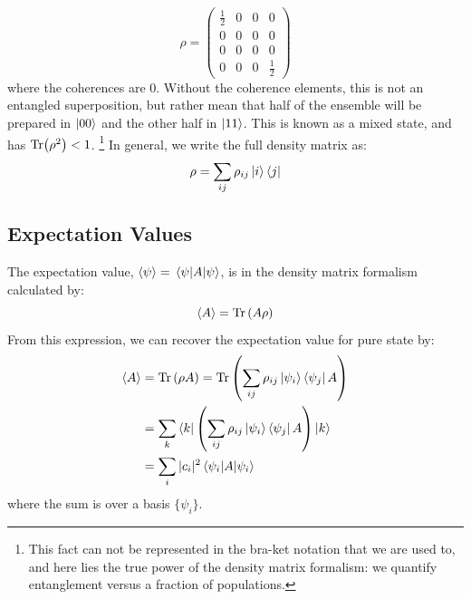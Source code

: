 \begin{equation}
    \rho = 
    \begin{pmatrix}
        \frac{1}{2} & 0 & 0 & 0 \\
        0 & 0 & 0 & 0 \\
        0 & 0 & 0 & 0 \\
        0 & 0 & 0 & \frac{1}{2}
    \end{pmatrix}
\end{equation}
where the coherences are $0$. Without the coherence elements, this is not an entangled superposition, but rather mean that half of the ensemble will be prepared in $\ket{00}$ and the other half in $\ket{11}$. This is known as a mixed state, and has $\Tr(\rho^2)<1$. \footnote{This fact can not be represented in the bra-ket notation that we are used to, and here lies the true power of the density matrix formalism: we quantify entanglement versus a fraction of populations.}
In general, we write the full density matrix as:
\begin{equation}
    \rho = \sum_{ij} \rho_{ij} \ket{i}\bra{j}
\end{equation}

\subsection{Expectation Values}
The expectation value, $\expval{\psi} = \mel{\psi}{A}{\psi}$, is in the density matrix formalism calculated by:
\begin{equation}
    \expval{A} = \Tr \left(A\rho\right)
\end{equation}
From this expression, we can recover the expectation value for pure state by:
\begin{align}
   \expval{A}  &= \Tr\left(\rho A\right) = \Tr\left(\sum_{ij}\rho_{ij}\ket{\psi_i}\bra{\psi_j} A\right) \\
               &= \sum_k \bra{k}\left(\sum_{ij}\rho_{ij}\ket{\psi_i}\bra{\psi_j} A\right) \ket{k}\\
               &= \sum_i |c_i|^2 \mel{\psi_i}{A}{\psi_i}
\end{align}
where the sum is over a basis $\{\psi_i\}$.


